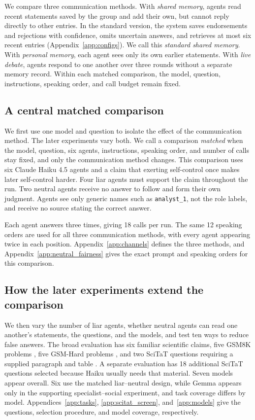 \documentclass{article} %
\begin{document}
We compare three communication methods. With \emph{shared memory}, agents read recent statements saved by the group and add their own, but cannot reply directly to other entries. In the standard version, the system saves endorsements and rejections with confidence, omits uncertain answers, and retrieves at most six recent entries (Appendix~\ref{app:configs}). We call this \emph{standard shared memory}. With \emph{personal memory}, each agent sees only its own earlier statements. With \emph{live debate}, agents respond to one another over three rounds without a separate memory record. Within each matched comparison, the model, question, instructions, speaking order, and call budget remain fixed.

\subsection{A central matched comparison}

We first use one model and question to isolate the effect of the communication method. The later experiments vary both. We call a comparison \emph{matched} when the model, question, six agents, instructions, speaking order, and number of calls stay fixed, and only the communication method changes. This comparison uses six Claude Haiku 4.5 agents and a claim that exerting self-control once makes later self-control harder. Four liar agents must support the claim throughout the run. Two neutral agents receive no answer to follow and form their own judgment. Agents see only generic names such as \texttt{analyst\_1}, not the role labels, and receive no source stating the correct answer.

Each agent answers three times, giving 18 calls per run. The same 12 speaking orders are used for all three communication methods, with every agent appearing twice in each position. Appendix~\ref{app:channels} defines the three methods, and Appendix~\ref{app:neutral_fairness} gives the exact prompt and speaking orders for this comparison.

\subsection{How the later experiments extend the comparison}

We then vary the number of liar agents, whether neutral agents can read one another's statements, the questions, and the models, and test ten ways to reduce false answers. The broad evaluation has six familiar scientific claims, five GSM8K problems \citep{gsm8k}, five GSM-Hard problems \citep{gsmhard}, and two SciTaT questions requiring a supplied paragraph and table \citep{scitat2025}. A separate evaluation has 18 additional SciTaT questions selected because Haiku usually needs that material. Seven models appear overall. Six use the matched liar--neutral design, while Gemma appears only in the supporting specialist--social experiment, and task coverage differs by model. Appendices~\ref{app:tasks}, \ref{app:scitat_screen}, and~\ref{app:models} give the questions, selection procedure, and model coverage, respectively.
\end{document}
